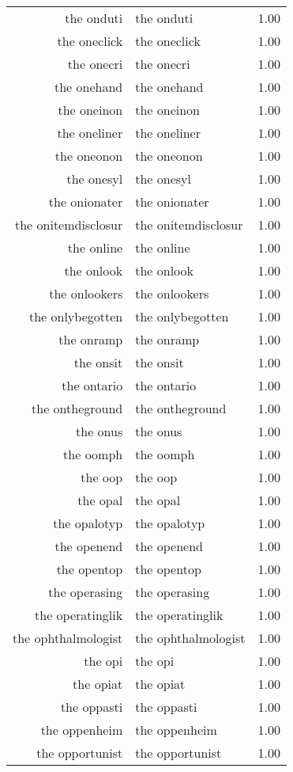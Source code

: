 \begin{table}[ht]
\begin{tabular}{rlr}
  the onduti & the onduti & 1.00 \\ 
  the oneclick & the oneclick & 1.00 \\ 
  the onecri & the onecri & 1.00 \\ 
  the onehand & the onehand & 1.00 \\ 
  the oneinon & the oneinon & 1.00 \\ 
  the oneliner & the oneliner & 1.00 \\ 
  the oneonon & the oneonon & 1.00 \\ 
  the onesyl & the onesyl & 1.00 \\ 
  the onionater & the onionater & 1.00 \\ 
  the onitemdisclosur & the onitemdisclosur & 1.00 \\ 
  the online & the online & 1.00 \\ 
  the onlook & the onlook & 1.00 \\ 
  the onlookers & the onlookers & 1.00 \\ 
  the onlybegotten & the onlybegotten & 1.00 \\ 
  the onramp & the onramp & 1.00 \\ 
  the onsit & the onsit & 1.00 \\ 
  the ontario & the ontario & 1.00 \\ 
  the ontheground & the ontheground & 1.00 \\ 
  the onus & the onus & 1.00 \\ 
  the oomph & the oomph & 1.00 \\ 
  the oop & the oop & 1.00 \\ 
  the opal & the opal & 1.00 \\ 
  the opalotyp & the opalotyp & 1.00 \\ 
  the openend & the openend & 1.00 \\ 
  the opentop & the opentop & 1.00 \\ 
  the operasing & the operasing & 1.00 \\ 
  the operatinglik & the operatinglik & 1.00 \\ 
  the ophthalmologist & the ophthalmologist & 1.00 \\ 
  the opi & the opi & 1.00 \\ 
  the opiat & the opiat & 1.00 \\ 
  the oppasti & the oppasti & 1.00 \\ 
  the oppenheim & the oppenheim & 1.00 \\ 
  the opportunist & the opportunist & 1.00 \\ 

\end{tabular}
\end{table}
